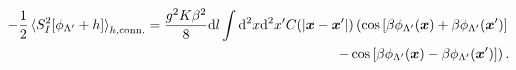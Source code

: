 \documentclass{svmono}
\def\rd{\mathrm d}
\newcommand{\commutator}[1]{\left[ #1 \right]}
\providecommand{\DIFaddbegin}{} %
\providecommand{\DIFaddend}{} %
\providecommand{\DIFdelbegin}{} %
\providecommand{\DIFdelend}{} %
\newcommand{\DIFscaledelfig}{0.5}
\newlength{\DIFdelgraphicswidth} %
\newlength{\DIFdelgraphicsheight} %
\newcommand{\DIFaddincludegraphics}[2][]{{\color{blue}\fbox{\DIFOincludegraphics[#1]{#2}}}} %
\newcommand{\DIFdelincludegraphics}[2][]{%
\sbox{\DIFdelgraphicsbox}{\DIFOincludegraphics[#1]{#2}}%
\settoboxwidth{\DIFdelgraphicswidth}{\DIFdelgraphicsbox} %
\settoboxtotalheight{\DIFdelgraphicsheight}{\DIFdelgraphicsbox} %
\scalebox{\DIFscaledelfig}{%
\parbox[b]{\DIFdelgraphicswidth}{\usebox{\DIFdelgraphicsbox}\\[-\baselineskip] \rule{\DIFdelgraphicswidth}{0em}}\llap{\resizebox{\DIFdelgraphicswidth}{\DIFdelgraphicsheight}{%
\setlength{\unitlength}{\DIFdelgraphicswidth}%
\begin{picture}(1,1)%
\thicklines\linethickness{2pt} %
{\color[rgb]{1,0,0}\put(0,0){\framebox(1,1){}}}%
{\color[rgb]{1,0,0}\put(0,0){\line( 1,1){1}}}%
{\color[rgb]{1,0,0}\put(0,1){\line(1,-1){1}}}%
\end{picture}%
}\hspace*{3pt}}} %
} %
\DeclareRobustCommand{\DIFaddbegin}{\DIFOaddbegin \let\includegraphics\DIFaddincludegraphics} %
\DeclareRobustCommand{\DIFaddend}{\DIFOaddend \let\includegraphics\DIFOincludegraphics} %
\DeclareRobustCommand{\DIFdelbegin}{\DIFOdelbegin \let\includegraphics\DIFdelincludegraphics} %
\DeclareRobustCommand{\DIFdelend}{\DIFOaddend \let\includegraphics\DIFOincludegraphics} %
\begin{document}
\DIFdelbegin %
\DIFdelend \DIFaddbegin \begin{align}
    -\frac12\braket{S^2_I[\phi_{\Lambda'}+h]}_{h,{\rm conn.}} = \frac{g^2K\beta^2}8\rd l\int\rd^2x\rd^2x'
    C(|{\bm x}-{\bm x'}|)
    \left(
        \cos\commutator{\beta\phi_{\Lambda'}({\bm x})+\beta\phi_{\Lambda'}({\bm x'})}
        \right.
        \\
        \left.-
        \cos\commutator{\beta\phi_{\Lambda'}({\bm x})-\beta\phi_{\Lambda'}({\bm x'})}
    \right).
\end{align}\DIFaddend 
\end{document}
